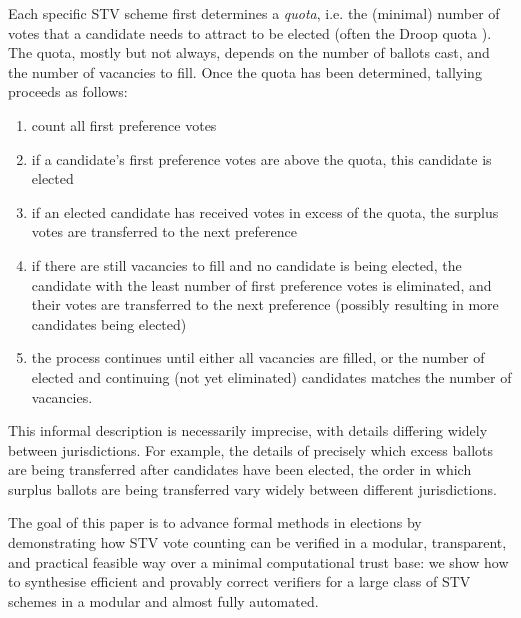 \documentclass[10pt,conference]{IEEEtran}
\begin{document}

Each specific STV scheme first determines a \emph{quota}, i.e. the (minimal) number of votes that a candidate needs to attract to be elected (often the Droop quota \cite{Droop:1881:MER}). The quota, mostly but not always, depends on the number of ballots cast, and the number of vacancies to fill. Once the quota has been determined, tallying proceeds as follows:
\begin{enumerate}
  \item count all first preference votes
  \item if a candidate's first preference votes are above the quota, this candidate is elected
  \item if an elected candidate has received votes in excess of the quota, the surplus votes are transferred to the next preference 
  \item if there are still vacancies to fill and no candidate is  being elected, the candidate with the least number of first preference votes is eliminated, and their votes are transferred to the next preference (possibly resulting in more candidates being elected)
  \item the process continues until either all vacancies are filled, or the number of elected and continuing (not yet eliminated) candidates matches the number of vacancies.
\end{enumerate}

This informal description is necessarily imprecise, with details differing widely between jurisdictions. For example,
the details of precisely which excess ballots are being transferred after candidates have been elected, the order in which surplus ballots are being transferred vary widely between different jurisdictions. 

The goal of this paper is to advance formal methods in elections by demonstrating how STV vote counting can be verified in a modular, transparent, and practical feasible way over a minimal computational trust base:  we show how to synthesise efficient and provably correct verifiers for a large class of STV schemes in a modular and almost fully automated. 
\end{document}
